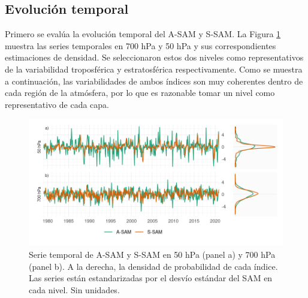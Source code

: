 \documentclass[12pt,oneside,a4paper]{reedthesis}
\begin{document}
\hypertarget{temporal}{%
\subsection{Evolución temporal}\label{temporal}}

Primero se evalúa la evolución temporal del A-SAM y S-SAM.
La Figura \ref{fig:asymsam-timeseries} muestra las series temporales en 700 hPa y 50 hPa y sus correspondientes estimaciones de densidad.
Se seleccionaron estos dos niveles como representativos de la variabilidad troposférica y estratosférica respectivamente.
Como se muestra a continuación, las variabilidades de ambos índices son muy coherentes dentro de cada región de la atmósfera, por lo que es razonable tomar un nivel como representativo de cada capa.



\begin{figure}

{\centering \includegraphics{figures/30-sam/asymsam-timeseries-1} 

}

\caption{Serie temporal de A-SAM y S-SAM en 50 hPa (panel a) y 700 hPa (panel b). A la derecha, la densidad de probabilidad de cada índice. Las series están estandarizadas por el desvío estándar del SAM en cada nivel. Sin unidades.}\label{fig:asymsam-timeseries}
\end{figure}
\end{document}
